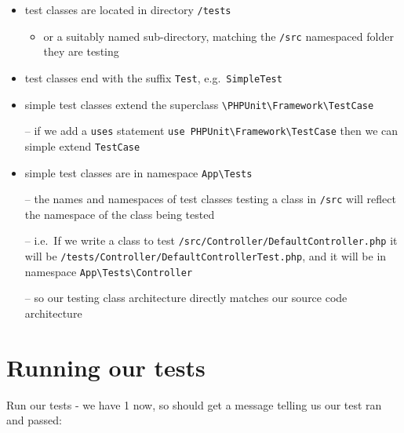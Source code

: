 \documentclass[a4paperpaper,openright]{book}
\newenvironment{Shaded}{}{}
\newcommand{\BuiltInTok}[1]{#1}
\newcommand{\ExtensionTok}[1]{#1}
\newcommand{\NormalTok}[1]{#1}
\providecommand{\tightlist}{%
  \setlength{\itemsep}{0pt}\setlength{\parskip}{0pt}}
\begin{document}
\begin{itemize}
\item
  test classes are located in directory \texttt{/tests}

  \begin{itemize}
  \tightlist
  \item
    or a suitably named sub-directory, matching the \texttt{/src}
    namespaced folder they are testing
  \end{itemize}
\item
  test classes end with the suffix \texttt{Test},
  e.g.~\texttt{SimpleTest}
\item
  simple test classes extend the superclass
  \texttt{\textbackslash{}PHPUnit\textbackslash{}Framework\textbackslash{}TestCase}

  -- if we add a \texttt{uses} statement
  \texttt{use\ PHPUnit\textbackslash{}Framework\textbackslash{}TestCase}
  then we can simple extend \texttt{TestCase}
\item
  simple test classes are in namespace \texttt{App\textbackslash{}Tests}

  -- the names and namespaces of test classes testing a class in
  \texttt{/src} will reflect the namespace of the class being tested

  -- i.e.~If we write a class to test
  \texttt{/src/Controller/DefaultController.php} it will be
  \texttt{/tests/Controller/DefaultControllerTest.php}, and it will be
  in namespace
  \texttt{App\textbackslash{}Tests\textbackslash{}Controller}

  -- so our testing class architecture directly matches our source code
  architecture
\end{itemize}

\hypertarget{running-our-tests}{%
\section{Running our tests}\label{running-our-tests}}

Run our tests - we have 1 now, so should get a message telling us our
test ran and passed:

\begin{Shaded}
\end{Shaded}
\end{document}
